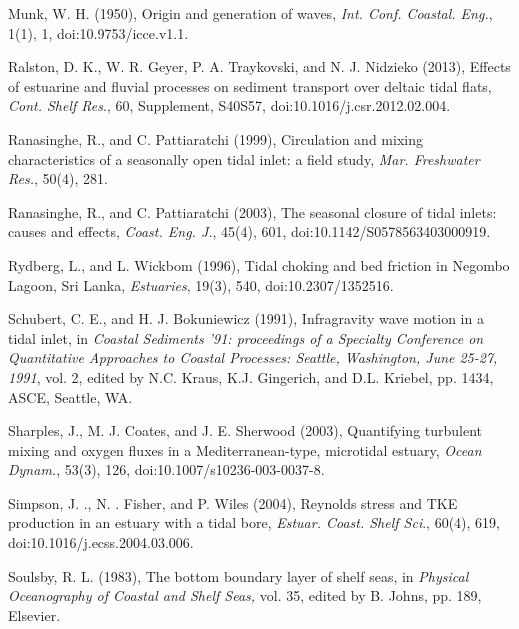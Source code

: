 \begin{thebibliography}
Munk, W. H. (1950), Origin
and generation of waves, \emph{Int. Conf. Coastal. Eng.}, 1(1), 1,
doi:10.9753/icce.v1.1. 

Ralston,
D. K., W. R. Geyer, P. A. Traykovski, and N. J. Nidzieko (2013), Effects
of estuarine and fluvial processes on sediment transport over deltaic
tidal flats, \emph{Cont. Shelf Res}., 60, Supplement, S40\textendash S57,
doi:10.1016/j.csr.2012.02.004. 

Ranasinghe,
R., and C. Pattiaratchi (1999), Circulation and mixing characteristics
of a seasonally open tidal inlet: a field study, \emph{Mar. Freshwater
Res.}, 50(4), 281.

Ranasinghe,
R., and C. Pattiaratchi (2003), The seasonal closure of tidal inlets:
causes and effects, \emph{Coast. Eng. J.}, 45(4), 601,
doi:10.1142/S0578563403000919. 

Rydberg,
L., and L. Wickbom (1996), Tidal choking and bed friction in Negombo
Lagoon, Sri Lanka, \emph{Estuaries}, 19(3), 540, doi:10.2307/1352516. 

Schubert,
C. E., and H. J. Bokuniewicz (1991), Infragravity wave motion in a
tidal inlet, in \emph{Coastal Sediments \textquoteright 91: proceedings
of a Specialty Conference on Quantitative Approaches to Coastal Processes:
Seattle, Washington, June 25-27, 1991}, vol. 2, edited by N.C. Kraus,
K.J. Gingerich, and D.L. Kriebel, pp. 1434, ASCE,
Seattle, WA. 

Sharples,
J., M. J. Coates, and J. E. Sherwood (2003), Quantifying turbulent
mixing and oxygen fluxes in a Mediterranean-type, microtidal estuary,
\emph{Ocean Dynam.}, 53(3), 126, doi:10.1007/s10236-003-0037-8. 

Simpson,
J. ., N. . Fisher, and P. Wiles (2004), Reynolds stress and TKE production
in an estuary with a tidal bore, \emph{Estuar. Coast. Shelf Sci}.,
60(4), 619, doi:10.1016/j.ecss.2004.03.006. 

Soulsby, R. L. (1983),
The bottom boundary layer of shelf seas, in \emph{Physical Oceanography
of Coastal and Shelf Seas, }vol. 35, edited by B. Johns, pp. 189,
Elsevier. 


\end{thebibliography}
